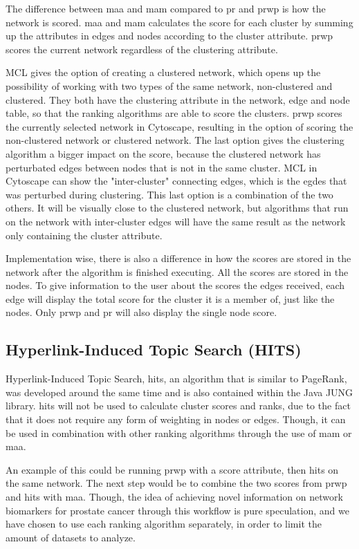The difference between \gls{maa} and \gls{mam} compared to \gls{pr} and
\gls{prwp} is how the network is scored. \gls{maa} and \gls{mam} calculates the
score for each cluster by summing up the attributes in edges and nodes according
to the cluster attribute. \gls{prwp} scores the current network regardless of
the clustering attribute. 

MCL gives the option of creating a clustered network, which opens up the
possibility of working with two types of the same network, non-clustered and
clustered. They both have the clustering attribute in the network, edge and node
table, so that the ranking algorithms are able to score the clusters. \gls{prwp}
scores the currently selected network in Cytoscape, resulting in the option of
scoring the non-clustered network or clustered network. The last option gives
the clustering algorithm a bigger impact on the score, because the clustered
network has perturbated edges between nodes that is not in the same cluster. MCL
in Cytoscape can show the "inter-cluster" connecting edges, which is the egdes
that was perturbed during clustering. This last option is a combination of the
two others. It will be visually close to the clustered network, but algorithms
that run on the network with inter-cluster edges will have the same result as
the network only containing the cluster attribute.

Implementation wise, there is also a difference in how the scores are stored in
the network after the algorithm is finished executing. All the scores are stored
in the nodes. To give information to the user about the scores the edges
received, each edge will display the total score for the cluster it is a member
of, just like the nodes. Only \gls{prwp} and \gls{pr} will also display the
single node score.

\subsection{Hyperlink-Induced Topic Search (HITS)}
Hyperlink-Induced Topic Search, \gls{hits}, an algorithm that is similar to
PageRank, was developed around the same time \cite{hits}\cite{hits-origin} and
is also contained within the Java JUNG library. \gls{hits} will not be used to
calculate cluster scores and ranks, due to the fact that it does not require any
form of weighting in nodes or edges. Though, it can be used in combination with
other ranking algorithms through the use of \gls{mam} or \gls{maa}. 

An example of this could be running \gls{prwp} with a score attribute, then
\gls{hits} on the same network. The next step would be to combine the two scores
from \gls{prwp} and \gls{hits} with \gls{maa}. Though, the idea of achieving
novel information on network biomarkers for prostate cancer through this
workflow is pure speculation, and we have chosen to use each ranking algorithm
separately, in order to limit the amount of datasets to analyze.


